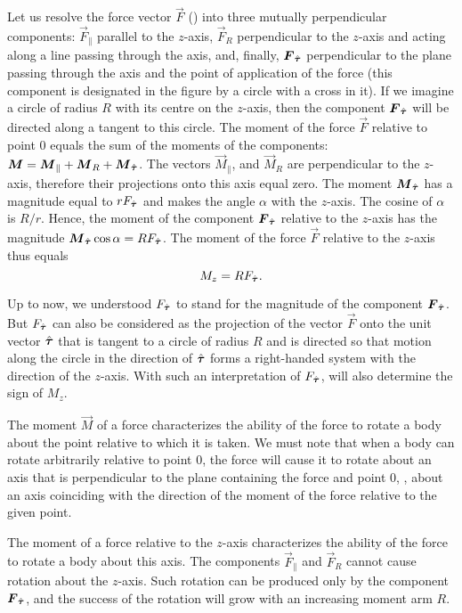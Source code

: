 \noindent
Let us resolve the force vector $\vec{F}$ () into three mutually perpendicular components: $\vec{F}_{\parallel}$ parallel to the $z$-axis, $\vec{F}_R$ perpendicular to the $z$-axis and acting along a line passing through the axis, and, finally, $\boldsymbol{F}_{\hat{\boldsymbol{\tau}}}$ perpendicular to the plane passing through the axis and the point of application of the force (this component is designated in the figure by a circle with a cross in it). If we imagine a circle of radius $R$ with its centre on the $z$-axis, then the component $\boldsymbol{F}_{\hat{\boldsymbol{\tau}}}$ will be directed along a tangent to this circle. The moment of the force $\vec{F}$ relative to point $0$ equals the sum of the moments of the components: $\boldsymbol{M}=\boldsymbol{M}_{\parallel}+\boldsymbol{M}_R+\boldsymbol{M}_{\hat{\boldsymbol{\tau}}}$. The vectors $\vec{M}_{\parallel}$, and $\vec{M}_R$ are perpendicular to the $z$-axis, therefore their projections onto this axis equal zero. The moment $\boldsymbol{M}_{\hat{\boldsymbol{\tau}}}$ has a magnitude equal to $rF_{\hat{\boldsymbol{\tau}}}$ and makes the angle $\alpha$ with the $z$-axis. The cosine of $\alpha$ is $R/r$. Hence, the moment of the component $\boldsymbol{F}_{\hat{\boldsymbol{\tau}}}$ relative to the $z$-axis has the magnitude $\boldsymbol{M}_{\hat{\boldsymbol{\tau}}}\cos\alpha=RF_{\hat{\boldsymbol{\tau}}}$. The moment of the force $\vec{F}$ relative to the $z$-axis thus equals
\begin{equation}\label{eq:3_115}
M_z = RF_{\hat{\boldsymbol{\tau}}}.
\end{equation}

\noindent
Up to now, we understood $F_{\hat{\boldsymbol{\tau}}}$ to stand for the magnitude of the component $\boldsymbol{F}_{\hat{\boldsymbol{\tau}}}$. But $F_{\hat{\boldsymbol{\tau}}}$ can also be considered as the projection of the vector $\vec{F}$ onto the unit vector $\hat{\boldsymbol{\tau}}$ that is tangent to a circle of radius $R$ and is directed so that motion along the circle in the direction of $\hat{\boldsymbol{\tau}}$ forms a right-handed system with the direction of the $z$-axis. With such an interpretation of $F_{\hat{\boldsymbol{\tau}}}$,  will also determine the sign of $M_z$.

The moment $\vec{M}$ of a force characterizes the ability of the force to rotate a body about the point relative to which it is taken. We must note that when a body can rotate arbitrarily relative to point $0$, the force will cause it to rotate about an axis that is perpendicular to the plane containing the force and point $0$, \ie, about an axis coinciding with the direction of the moment of the force relative to the given point.

The moment of a force relative to the $z$-axis characterizes the ability of the force to rotate a body about this axis. The components $\vec{F}_{\parallel}$ and $\vec{F}_{R}$ cannot cause rotation about the $z$-axis. Such rotation can be produced only by the component $\boldsymbol{F}_{\hat{\boldsymbol{\tau}}}$, and the success of the rotation will grow with an increasing moment arm $R$.

